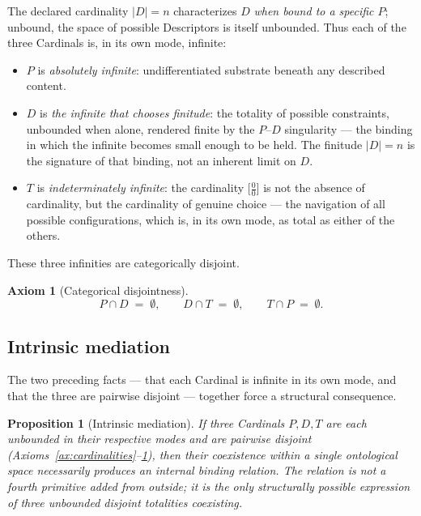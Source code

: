 \documentclass[11pt,a4paper]{article}
\newtheorem{proposition}[theorem]{Proposition}
\theoremstyle{definition}
\newtheorem{axiom}[theorem]{Axiom}
\theoremstyle{remark}
\begin{document}
The declared cardinality $|D|=n$ characterizes $D$ \emph{when bound to a specific $P$}; unbound, the space of possible Descriptors is itself unbounded. Thus each of the three Cardinals is, in its own mode, infinite:
\begin{itemize}[leftmargin=*]
\item $P$ is \emph{absolutely infinite}: undifferentiated substrate beneath any described content.
\item $D$ is \emph{the infinite that chooses finitude}: the totality of possible constraints, unbounded when alone, rendered finite by the $P$--$D$ singularity --- the binding in which the infinite becomes small enough to be held. The finitude $|D|=n$ is the signature of that binding, not an inherent limit on $D$.
\item $T$ is \emph{indeterminately infinite}: the cardinality $\bigl[\tfrac{0}{0}\bigr]$ is not the absence of cardinality, but the cardinality of genuine choice --- the navigation of all possible configurations, which is, in its own mode, as total as either of the others.
\end{itemize}

These three infinities are categorically disjoint.

\begin{axiom}[Categorical disjointness]\label{ax:disjoint}
\[
P \cap D \;=\; \emptyset, \qquad D \cap T \;=\; \emptyset, \qquad T \cap P \;=\; \emptyset.
\]
\end{axiom}

\subsection{Intrinsic mediation}

The two preceding facts --- that each Cardinal is infinite in its own mode, and that the three are pairwise disjoint --- together force a structural consequence.

\begin{proposition}[Intrinsic mediation]\label{prop:intrinsic}
If three Cardinals $P,D,T$ are each unbounded in their respective modes and are pairwise disjoint (Axioms~\ref{ax:cardinalities}--\ref{ax:disjoint}), then their coexistence within a single ontological space necessarily produces an internal binding relation. The relation is not a fourth primitive added from outside; it is the only structurally possible expression of three unbounded disjoint totalities coexisting.
\end{proposition}
\end{document}
